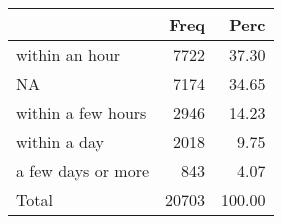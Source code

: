 
\begin{tabular}[t]{lrr}
\toprule
  & Freq & Perc\\
\midrule
within an hour & 7722 & 37.30\\
NA & 7174 & 34.65\\
within a few hours & 2946 & 14.23\\
within a day & 2018 & 9.75\\
a few days or more & 843 & 4.07\\
\addlinespace
Total & 20703 & 100.00\\
\bottomrule
\end{tabular}